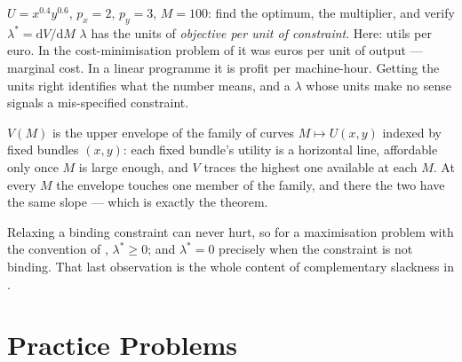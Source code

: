 \begin{worked}{$U=x^{0.4}y^{0.6}$, $p_{x}=2$, $p_{y}=3$, $M=100$: find the optimum, the multiplier, and verify $\lambda^{*}=\mathrm{d}V/\mathrm{d}M$}
$\lambda$ has the units of \emph{objective per unit of constraint}. Here:
utils per euro. In the cost-minimisation problem of  it was euros
per unit of output --- marginal cost. In a linear programme it is profit per
machine-hour. Getting the units right identifies what the number means, and
a $\lambda$ whose units make no sense signals a mis-specified constraint.

$V(M)$ is the upper envelope of the family of curves $M\mapsto U(x,y)$
indexed by fixed bundles $(x,y)$: each fixed bundle's utility is a
horizontal line, affordable only once $M$ is large enough, and $V$ traces
the highest one available at each $M$. At every $M$ the envelope touches one
member of the family, and there the two have the same slope --- which is
exactly the theorem.

Relaxing a binding constraint can never hurt, so for a maximisation problem
with the convention of , $\lambda^{*}\ge0$; and $\lambda^{*}=0$
precisely when the constraint is not binding. That last observation is the
whole content of complementary slackness in .
\end{worked}

\section{Practice Problems}

